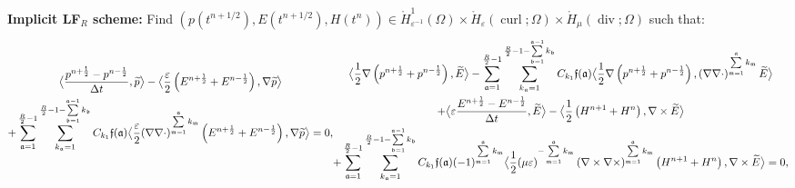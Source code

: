 \documentclass{amsart}
\theoremstyle{thmstyleone}%
\theoremstyle{thmstyletwo}%
\theoremstyle{thmstylethree}%
\DeclareMathOperator{\curl}{curl}
\def\divgn{\operatorname{div}}
\newcommand{\aInnerproduct}[2]{\bigl\langle #1, #2 \bigr\rangle}
\begin{document}
\smallskip \noindent \textbf{Implicit LF$_R$ scheme:} Find $(p(t^{n + 1/2}), E(t^{n + 1/2}), H(t^n)) \in \mathring{H}^1_{\varepsilon^{-1}}(\Omega) \times \mathring{H}_{\varepsilon}(\curl; \Omega) \times \mathring{H}_{\mu}(\divgn; \Omega)$ such that: 
\begin{subequations} 
\begin{multline}
  \aInnerproduct{\dfrac{p^{n + \frac{1}{2}} - p^{n - \frac{1}{2}}}{\Delta t}}{\widetilde{p}} - \aInnerproduct{\dfrac{\varepsilon}{2} \left( E^{n + \frac{1}{2}} + E^{n - \frac{1}{2}} \right)}{\nabla \widetilde{p}} \\ + \sum\limits_{\mathfrak{a} = 1}^{\frac{R}{2} - 1} \sum\limits_{k_\mathfrak{a} = 1}^{\frac{R}{2} - 1 - \sum\limits_{\mathfrak{b} = 1}^{\mathfrak{a} - 1} k_\mathfrak{b}} C_{k_1} \mathfrak{f}(\mathfrak{a}) \aInnerproduct{\dfrac{\varepsilon}{2} (\nabla \nabla \cdot)^{\sum\limits_{\mathfrak{m} = 1}^\mathfrak{a} k_\mathfrak{m}} \left( E^{n + \frac{1}{2}} + E^{n - \frac{1}{2}} \right)}{\nabla \widetilde{p}} =0, \label{eqn:maxwell_p_lfR}
  \end{multline} \\
  \begin{multline}
   \aInnerproduct{\dfrac{1}{2} \nabla \left(p^{n + \frac{1}{2}} + p^{n - \frac{1}{2}} \right)}{\widetilde{E}} - \sum\limits_{\mathfrak{a} = 1}^{\frac{R}{2} - 1} \sum\limits_{k_\mathfrak{a} = 1}^{\frac{R}{2} - 1 - \sum\limits_{\mathfrak{b} = 1}^{\mathfrak{a} - 1} k_\mathfrak{b}} C_{k_1} \mathfrak{f}(\mathfrak{a}) \aInnerproduct{\dfrac{1}{2} \nabla \left(p^{n + \frac{1}{2}} + p^{n - \frac{1}{2}} \right)}{\left( \nabla \nabla \cdot \right)^{\sum\limits_{\mathfrak{m} = 1}^\mathfrak{a} k_\mathfrak{m}} \widetilde{E}} \\ + \aInnerproduct{\varepsilon \dfrac{E^{n + \frac{1}{2}} - E^{n - \frac{1}{2}}}{\Delta t}}{\widetilde{E}} -  \aInnerproduct{\dfrac{1}{2} \left( H^{n + 1} + H^n \right)}{\nabla \times \widetilde{E}} \\ + \sum\limits_{\mathfrak{a} = 1}^{\frac{R}{2} - 1} \sum\limits_{k_\mathfrak{a} = 1}^{\frac{R}{2} - 1 - \sum\limits_{\mathfrak{b} = 1}^{\mathfrak{a} - 1} k_\mathfrak{b}} C_{k_1} \mathfrak{f}( \mathfrak{a}) (-1)^{\sum\limits_{\mathfrak{m} = 1}^\mathfrak{a} k_\mathfrak{m}} \aInnerproduct{\dfrac{1}{2} ( \mu \varepsilon )^{-\sum\limits_{\mathfrak{m} = 1}^\mathfrak{a} k_\mathfrak{m}} \left( \nabla \times \nabla \times \right)^{\sum\limits_{\mathfrak{m} = 1}^\mathfrak{a} k_\mathfrak{m}} \left( H^{n + 1} + H^n \right)}{\nabla \times \widetilde{E}} = 0, \label{eqn:maxwell_E_lfR} 
     \end{multline} \\

\end{subequations}
\end{document}
